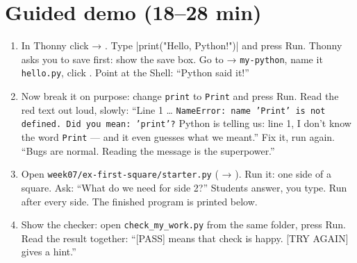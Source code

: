 \section{Guided demo (18--28 min)}
\begin{workedexample}
\begin{enumerate}[leftmargin=1.4em,itemsep=1pt]
  \item In Thonny click  → . Type \py|print("Hello, Python!")| and press Run. Thonny asks you to save first: show the save box. Go to  → \texttt{my-python}, name it \texttt{hello.py}, click . Point at the Shell: \enquote{Python said it!}
  \item Now break it on purpose: change \texttt{print} to \texttt{Print} and press Run. Read the red text out loud, slowly: \enquote{Line 1 \ldots{} \texttt{NameError: name 'Print' is not defined. Did you mean: 'print'?} Python is telling us: line 1, I don't know the word \texttt{Print} --- and it even guesses what we meant.} Fix it, run again. \enquote{Bugs are normal. Reading the message is the superpower.}
  \item Open \texttt{week07/ex-first-square/starter.py} ( → ). Run it: one side of a square. Ask: \enquote{What do we need for side 2?} Students answer, you type. Run after every side. The finished program is printed below.
  \item Show the checker: open \texttt{check\_my\_work.py} from the same folder, press Run. Read the result together: \enquote{[PASS] means that check is happy. [TRY AGAIN] gives a hint.}
\end{enumerate}
\end{workedexample}

